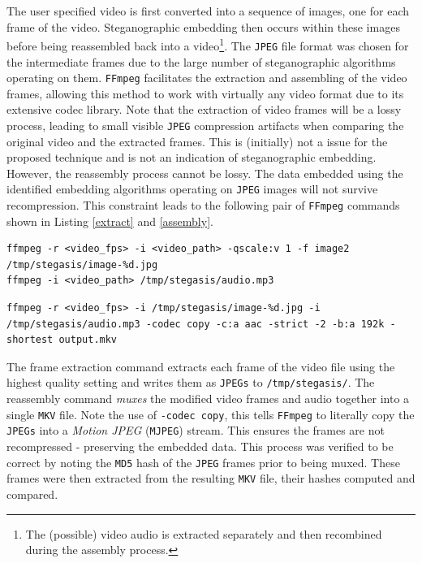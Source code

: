 \documentclass[paper=a4, fontsize=11pt,twoside]{scrartcl}
\numberwithin{table}{section}
\numberwithin{figure}{section}
\numberwithin{algorithm}{section}
\begin{document}
The user specified video is first converted into a sequence of images, one for each frame of the video. Steganographic embedding then occurs within these images before being reassembled back into a video\footnote{The (possible) video audio is extracted separately and then recombined during the assembly process.}. The \texttt{JPEG} file format was chosen for the intermediate frames due to the large number of steganographic algorithms operating on them. \texttt{FFmpeg} facilitates the extraction and assembling of the video frames, allowing this method to work with virtually any video format due to its extensive codec library. Note that the extraction of video frames will be a lossy process, leading to small visible \texttt{JPEG} compression artifacts when comparing the original video and the extracted frames. This is (initially) not a issue for the proposed technique and is not an indication of steganographic embedding. However, the reassembly process cannot be lossy. The data embedded using the identified embedding algorithms operating on \texttt{JPEG} images will not survive recompression. This constraint leads to the following pair of \texttt{FFmpeg} commands shown in Listing \ref{extract} and \ref{assembly}.


\begin{lstlisting}[caption={\texttt{FFmpeg} frame extraction command.}, frame=single, label=extract,upquote=true]
ffmpeg -r <video_fps> -i <video_path> -qscale:v 1 -f image2 /tmp/stegasis/image-%d.jpg
ffmpeg -i <video_path> /tmp/stegasis/audio.mp3
\end{lstlisting}

\begin{lstlisting}[caption={\texttt{FFmpeg} video reassembly command.}, frame=single, label=assembly,upquote=true]
ffmpeg -r <video_fps> -i /tmp/stegasis/image-%d.jpg -i /tmp/stegasis/audio.mp3 -codec copy -c:a aac -strict -2 -b:a 192k -shortest output.mkv
\end{lstlisting}

The frame extraction command extracts each frame of the video file using the highest quality setting and writes them as \texttt{JPEGs} to \texttt{/tmp/stegasis/}. The reassembly command \textit{muxes} the modified video frames and audio together into a single \texttt{MKV} file. Note the use of \texttt{-codec copy}, this tells \texttt{FFmpeg} to literally copy the \texttt{JPEGs} into a \textit{Motion JPEG} (\texttt{MJPEG}) stream. This ensures the frames are not recompressed - preserving the embedded data. This process was verified to be correct by noting the \texttt{MD5} hash of the \texttt{JPEG} frames prior to being muxed. These frames were then extracted from the resulting \texttt{MKV} file, their hashes computed and compared.
\end{document}

